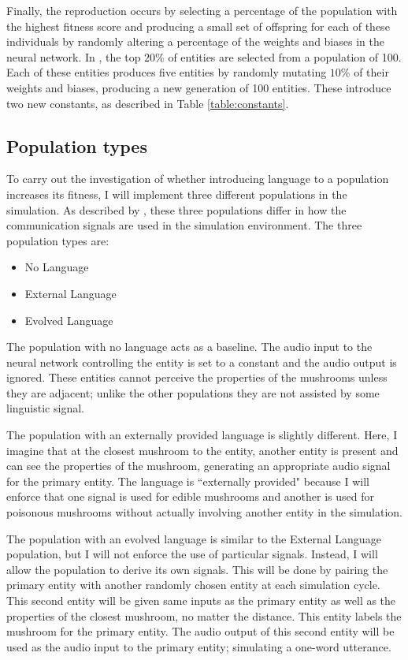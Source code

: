 \documentclass[12pt,a4paper,twoside,openright]{report}
\begin{document}
Finally, the reproduction occurs by selecting a percentage of the population with the highest fitness score and producing a small set of offspring for each of these individuals by randomly altering a percentage of the weights and biases in the neural network. In \cite{Cangelosi1998}, the top $20\%$ of entities are selected from a population of 100. Each of these entities produces five entities by randomly mutating $10\%$ of their weights and biases, producing a new generation of 100 entities. These introduce two new constants, as described in Table \ref{table:constants}.

\subsection{Population types}\label{section:populations}

To carry out the investigation of whether introducing language to a population increases its fitness, I will implement three different populations in the simulation. As described by \cite{Cangelosi1998}, these three populations differ in how the communication signals are used in the simulation environment. The three population types are:

\begin{itemize}
	\item No Language
	\item External Language
	\item Evolved Language
\end{itemize}

The population with no language acts as a baseline. The audio input to the neural network controlling the entity is set to a constant and the audio output is ignored. These entities cannot perceive the properties of the mushrooms unless they are adjacent; unlike the other populations they are not assisted by some linguistic signal.

The population with an externally provided language is slightly different. Here, I imagine that at the closest mushroom to the entity, another entity is present and can see the properties of the mushroom, generating an appropriate audio signal for the primary entity. The language is ``externally provided" because I will enforce that one signal is used for edible mushrooms and another is used for poisonous mushrooms without actually involving another entity in the simulation. 

The population with an evolved language is similar to the External Language population, but I will not enforce the use of particular signals. Instead, I will allow the population to derive its own signals. This will be done by pairing the primary entity with another randomly chosen entity at each simulation cycle. This second entity will be given same inputs as the primary entity as well as the properties of the closest mushroom, no matter the distance. This entity labels the mushroom for the primary entity. The audio output of this second entity will be used as the audio input to the primary entity; simulating a one-word utterance.
\end{document}

